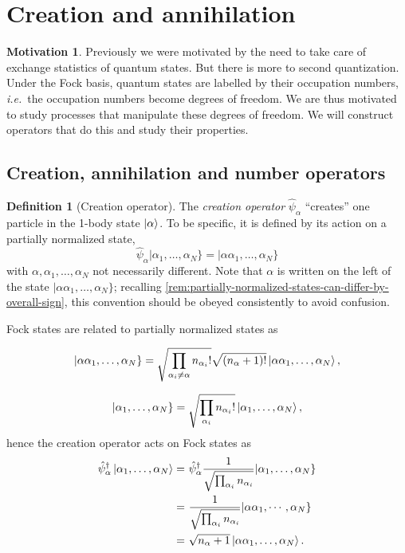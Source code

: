\documentclass{article}
\theoremstyle{definition}
\newtheorem{mot}{Motivation}[section]
\newtheorem{dfn}{Definition}[section]
\theoremstyle{plain}
\numberwithin{equation}{section}
\begin{document}
\section{Creation and annihilation}

\begin{mot}
    Previously we were motivated 
    by the need to take care of 
    exchange statistics of quantum states. 
    But there is more to second quantization. 
    Under the Fock basis, 
    quantum states are labelled by 
    their occupation numbers, \textit{i.e.}~the 
    occupation numbers become 
    degrees of freedom. 
    We are thus motivated to 
    study processes that manipulate 
    these degrees of freedom. 
    We will construct operators that 
    do this and study their properties.
\end{mot}

\subsection{Creation, annihilation and number operators}

\begin{dfn}[Creation operator]
    The \emph{creation operator} 
    $\hat{\psi}_{\alpha}$ 
    ``creates'' one particle 
    in the 1-body state $\ket{\alpha}$. 
    To be specific, 
    it is defined 
    by its action on a partially normalized state, 
    \begin{equation}
        \hat{\psi}_{\alpha}
        |\alpha_1, \ldots ,\alpha_{N}\}
        =
        |\alpha \alpha_{1}, \ldots ,\alpha_{N}\}
    \end{equation}
    with 
    $\alpha, \alpha_1, \ldots ,\alpha_{N}$ 
    not necessarily different. 
    Note that $\alpha$ is written 
    on the left of the state 
    $|\alpha\alpha_1, \ldots ,\alpha_{N}\}$; 
    recalling \cref{rem:partially-normalized-states-can-differ-by-overall-sign}, 
    this convention should be obeyed 
    consistently to avoid confusion.
\end{dfn}

Fock states are related to partially normalized states 
as 

\[
    |\alpha \alpha_{1}, \ldots ,\alpha_{N}\}
    =
    \sqrt{
        \prod_{\alpha_{i}\neq \alpha}
        n_{\alpha_{i}}!
    }
    \sqrt{(n_{\alpha}+1)!}
    \ket{\alpha \alpha_1, \ldots ,\alpha_{N}},
\]

\[
    |\alpha_1, \ldots ,\alpha_{N}\}
    =
    \sqrt{
        \prod_{\alpha_{i}}
        n_{\alpha_{i}}!
    }
    \ket{\alpha_1, \ldots ,\alpha_{N}},
\]
hence the creation operator 
acts on Fock states as 
\begin{align*}
    \hat{\psi}^{\dagger}_{\alpha}
    \ket{\alpha_1, \ldots ,\alpha_{N}}
    =&\ 
    \hat{\psi}^{\dagger}_{\alpha}
    \frac{1}{\sqrt{
        \prod_{\alpha_{i}}
        n_{\alpha_{i}}
    }}
    |\alpha_1, \ldots ,\alpha_{N}\} \\
    =&\ 
    \frac{1}{\sqrt{
        \prod_{\alpha_i}
        n_{\alpha_i}
    }}
    |\alpha \alpha_{1},\cdots, \alpha_{N}\} \\
    =&\ 
    \sqrt{n_{\alpha}+1}
    \ket{\alpha \alpha_{1}, \ldots ,\alpha_{N}}.
\end{align*}
\end{document}
